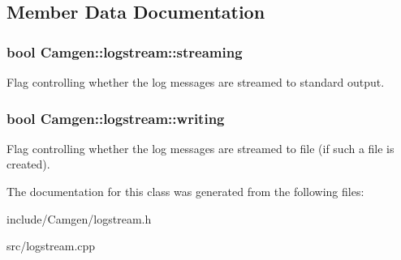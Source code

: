 \subsection{Member Data Documentation}
\hypertarget{a00330_a27e6b54cae2e0c36403e0002bbcd1b2c}{}
\subsubsection[{streaming}]{\setlength{\rightskip}{0pt plus 5cm}bool Camgen\+::logstream\+::streaming}\label{a00330_a27e6b54cae2e0c36403e0002bbcd1b2c}


Flag controlling whether the log messages are streamed to standard output. 

\hypertarget{a00330_a6731cdd504121f6565943c9875ab6814}{}
\subsubsection[{writing}]{\setlength{\rightskip}{0pt plus 5cm}bool Camgen\+::logstream\+::writing}\label{a00330_a6731cdd504121f6565943c9875ab6814}


Flag controlling whether the log messages are streamed to file (if such a file is created). 



The documentation for this class was generated from the following files\+:\begin{DoxyCompactItemize}
\item 
include/\+Camgen/logstream.\+h\item 
src/logstream.\+cpp\end{DoxyCompactItemize}
